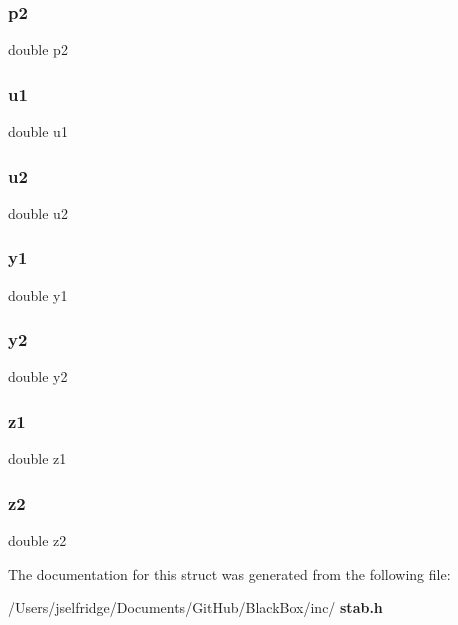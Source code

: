 \subsubsection{p2}
{\footnotesize\ttfamily double p2}

\mbox{\label{structid__struct_a2ccf16ee2880275520693c950f4e165a}} 
\subsubsection{u1}
{\footnotesize\ttfamily double u1}

\mbox{\label{structid__struct_ac2e2a4e58dbffb74b80be2322219d833}} 
\subsubsection{u2}
{\footnotesize\ttfamily double u2}

\mbox{\label{structid__struct_ac3b72e5b77595ca2340ecf8ccfe5fd99}} 
\subsubsection{y1}
{\footnotesize\ttfamily double y1}

\mbox{\label{structid__struct_a5347e514ebe985fb371754ffd2b5ff83}} 
\subsubsection{y2}
{\footnotesize\ttfamily double y2}

\mbox{\label{structid__struct_a0e1fe82df628138c8f3907ecddb514ae}} 
\subsubsection{z1}
{\footnotesize\ttfamily double z1}

\mbox{\label{structid__struct_a822ab991099a420eb62b3f0e2b0021a2}} 
\subsubsection{z2}
{\footnotesize\ttfamily double z2}



The documentation for this struct was generated from the following file\+:\begin{DoxyCompactItemize}
\item 
/\+Users/jselfridge/\+Documents/\+Git\+Hub/\+Black\+Box/inc/\textbf{ stab.\+h}\end{DoxyCompactItemize}
